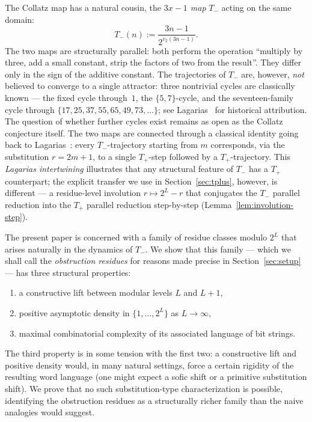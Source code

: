\documentclass[11pt,reqno]{amsart}
\theoremstyle{plain}
\theoremstyle{definition}
\theoremstyle{remark}
\newcommand{\Tplus}{T_{+}}
\newcommand{\Tminus}{T_{-}}
\newcommand{\vtwo}{v_{2}}
\begin{document}
The Collatz map has a natural cousin, the \emph{$3x-1$ map} $\Tminus$ acting
on the same domain:
\[
\Tminus(n) := \frac{3n-1}{2^{\vtwo(3n-1)}}.
\]
The two maps are structurally parallel: both perform the operation
``multiply by three, add a small constant, strip the factors of two from the
result''. They differ only in the sign of the additive constant. The
trajectories of $\Tminus$ are, however, \emph{not} believed to converge to a
single attractor: three nontrivial cycles are classically known --- the
fixed cycle through~$1$, the $\{5, 7\}$-cycle, and the seventeen-family cycle
through $\{17, 25, 37, 55, 65, 49, 73, \ldots\}$; see
Lagarias~\cite{Lagarias2010bib} for historical attribution. The question of
whether further cycles exist remains as open as the Collatz conjecture itself.
The two maps are connected through a classical identity going back to
Lagarias~\cite{Lagarias1985}: every $\Tminus$-trajectory starting from $m$
corresponds, via the substitution $r = 2m+1$, to a single $\Tplus$-step
followed by a $\Tplus$-trajectory. This \emph{Lagarias intertwining}
illustrates that any structural feature of $\Tminus$ has a $\Tplus$
counterpart; the explicit transfer we use in
Section~\ref{sec:tplus}, however, is different — a residue-level
involution $r \mapsto 2^L - r$ that conjugates the $\Tminus$ parallel
reduction into the $\Tplus$ parallel reduction step-by-step
(Lemma~\ref{lem:involution-step}).

The present paper is concerned with a family of residue classes modulo
$2^L$ that arises naturally in the dynamics of $\Tminus$. We show that this
family --- which we shall call the \emph{obstruction residues} for reasons
made precise in Section~\ref{sec:setup} --- has three structural properties:

\begin{enumerate}[label=(\arabic*)]
\item a constructive lift between modular levels $L$ and $L+1$,
\item positive asymptotic density in $\{1, \ldots, 2^L\}$ as $L \to \infty$,
\item maximal combinatorial complexity of its associated language of bit
  strings.
\end{enumerate}

The third property is in some tension with the first two: a constructive
lift and positive density would, in many natural settings, force a certain
rigidity of the resulting word language (one might expect a sofic shift or a
primitive substitution shift). We prove that no such substitution-type
characterization is possible, identifying the obstruction residues as a
structurally richer family than the naive analogies would suggest.
\end{document}
